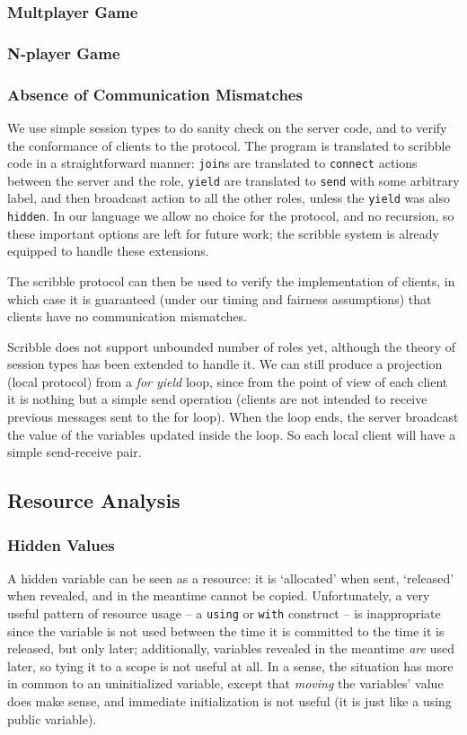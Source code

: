 \documentclass[acmsmall,review,anonymous]{acmart}\settopmatter{printfolios=true,printccs=false,printacmref=false}
\begin{document}
\subsubsection{Multplayer Game}

\subsubsection{N-player Game}


\subsubsection{Absence of Communication Mismatches}
We use simple session types to do sanity check on the server code, and to verify the conformance of clients to the protocol. The program is translated to scribble code in a straightforward manner: \texttt{join}s are translated to \texttt{connect} actions between the server and the role, \texttt{yield} are translated to \texttt{send} with some arbitrary label, and then broadcast action to all the other roles, unless the \texttt{yield} was also \texttt{hidden}. In our language we allow no choice for the protocol, and no recursion, so these important options are left for future work; the scribble system is already equipped to handle these extensions.

The scribble protocol can then be used to verify the implementation of clients, in which case it is guaranteed (under our timing and fairness assumptions) that clients have no communication mismatches.

Scribble does not support unbounded number of roles yet, although the theory of session types has been extended to handle it. We can still produce a projection (local protocol) from a \textit{for yield} loop, since from the point of view of each client it is nothing but a simple send operation (clients are not intended to receive previous messages sent to the for loop). When the loop ends, the server broadcast the value of the variables updated inside the loop. So each local client will have a simple send-receive pair.

\subsection{Resource Analysis}
\subsubsection{Hidden Values}
A hidden variable can be seen as a resource: it is `allocated' when sent, `released' when revealed, and in the meantime cannot be copied. Unfortunately, a very useful pattern of resource usage -- a \texttt{using} or \texttt{with} construct -- is inappropriate since the variable is not used between the time it is committed to the time it is released, but only later; additionally, variables revealed in the meantime \textit{are} used later, so tying it to a scope is not useful at all. In a sense, the situation has more in common to an uninitialized variable, except that \textit{moving} the variables' value does make sense, and immediate initialization is not useful (it is just like a using public variable).
\end{document}
